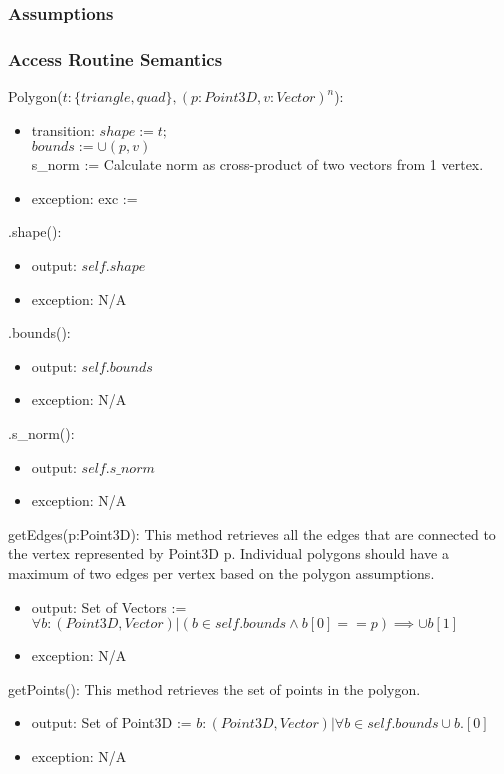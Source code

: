 \documentclass[12pt, titlepage]{article}
\begin{document}
\subsubsection{Assumptions}

\subsubsection{Access Routine Semantics}
\noindent Polygon($t:\{triangle, quad\}, (p:Point3D, v:Vector)^n$):
\begin{itemize}
	\item transition: $shape := t;$ \\
	$bounds := \cup (p,v)$ \\
	s\_norm := Calculate norm as cross-product of two vectors from 1 vertex.
	\item exception: exc := \\
\end{itemize}

\noindent .shape():
\begin{itemize}
	\item output: $self.shape$
	\item exception: N/A
\end{itemize}

\noindent .bounds():
\begin{itemize}
	\item output: $self.bounds$
	\item exception: N/A
\end{itemize}

\noindent .s\_norm():
\begin{itemize}
	\item output: $self.s\_norm$
	\item exception: N/A
\end{itemize}

\noindent getEdges(p:Point3D):
This method retrieves all the edges that are connected to the vertex 
represented by Point3D p. Individual polygons should have a maximum of two 
edges per vertex based on the polygon assumptions.
\begin{itemize}
	\item output: Set of Vectors := $\forall b : (Point3D,Vector) | (b \in 
	self.bounds \wedge b[0] == p) \implies \cup b[1] $
	\item exception: N/A
\end{itemize}

\noindent getPoints():
This method retrieves the set of points in the polygon.
\begin{itemize}
	\item output: Set of Point3D := $b: (Point3D, Vector)| \forall b \in 
	self.bounds  \cup b.[0]$
	\item exception: N/A
\end{itemize}
\end{document}
